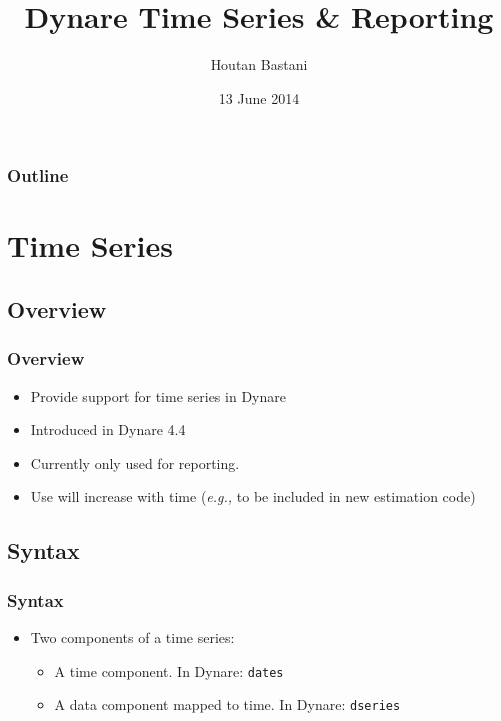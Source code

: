 \documentclass[10pt]{beamer}
\title{Dynare Time Series \& Reporting}
\author{Houtan Bastani}
\institute{CEPREMAP}
\date{13 June 2014}
\begin{document}
\begin{frame}
  \titlepage
\end{frame}

\begin{frame}[t]
  \frametitle{Outline}
  \tableofcontents
\end{frame}




%
%
\section{Time Series}

\subsection{Overview}
\begin{frame}[fragile,t]
  \frametitle{Overview}
  \begin{itemize}
  \item Provide support for time series in Dynare
  \item Introduced in Dynare 4.4
  \item Currently only used for reporting.
  \item Use will increase with time (\textit{e.g.,} to be included in new estimation code)
  \end{itemize}
\end{frame}


\subsection{Syntax}
\begin{frame}[fragile,t]
  \frametitle{Syntax}
  \begin{itemize}
  \item Two components of a time series:
    \begin{itemize}
    \item A time component. In Dynare: \texttt{dates}
    \item A data component mapped to time. In Dynare: \texttt{dseries}
    \end{itemize}
  \end{itemize}
\end{frame}
\end{document}
